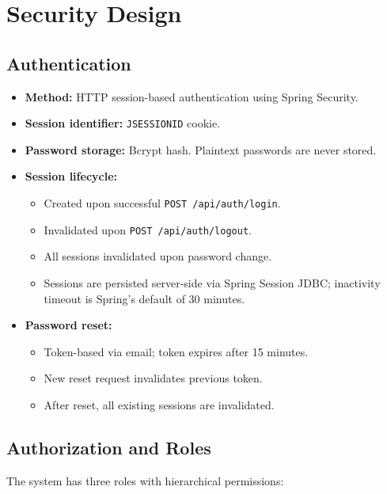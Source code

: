 \documentclass[11pt,a4paper]{article}
\begin{document}
\section{Security Design}
\label{sec:security}

\subsection{Authentication}

\begin{itemize}[leftmargin=1.5em]
    \item \textbf{Method:} HTTP session-based authentication using Spring Security.
    \item \textbf{Session identifier:} \texttt{JSESSIONID} cookie.
    \item \textbf{Password storage:} Bcrypt hash. Plaintext passwords are never stored.
    \item \textbf{Session lifecycle:}
    \begin{itemize}
        \item Created upon successful \texttt{POST /api/auth/login}.
        \item Invalidated upon \texttt{POST /api/auth/logout}.
        \item All sessions invalidated upon password change.
        \item Sessions are persisted server-side via Spring Session JDBC; inactivity timeout is Spring's default of 30 minutes.
    \end{itemize}
    \item \textbf{Password reset:}
    \begin{itemize}
        \item Token-based via email; token expires after 15 minutes.
        \item New reset request invalidates previous token.
        \item After reset, all existing sessions are invalidated.
    \end{itemize}
\end{itemize}

\subsection{Authorization and Roles}

The system has three roles with hierarchical permissions:
\end{document}
